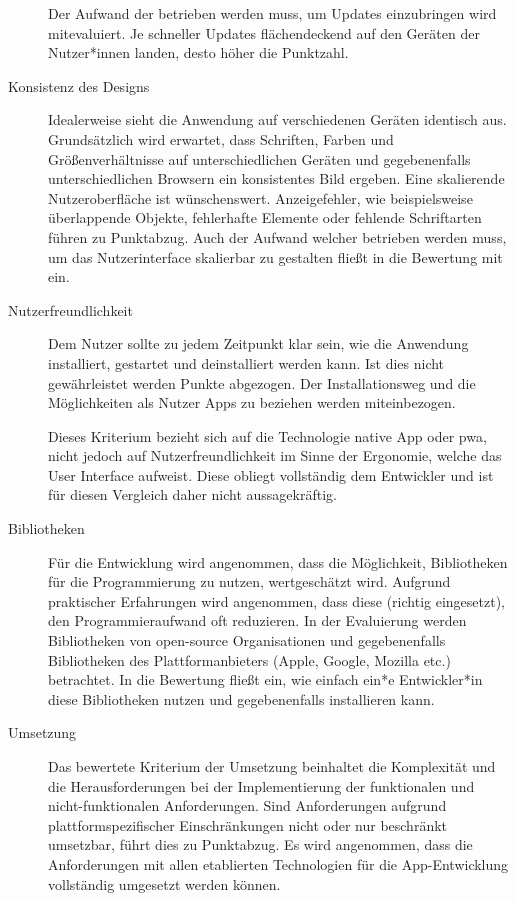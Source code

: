 \begin{description}
	      Der Aufwand der betrieben werden muss, um Updates einzubringen wird mitevaluiert. Je schneller Updates flächendeckend auf den Geräten der Nutzer*innen landen, desto höher die Punktzahl.

	\item [Konsistenz des Designs]
	      Idealerweise sieht die Anwendung auf verschiedenen Geräten identisch aus. Grundsätzlich wird erwartet, dass Schriften, Farben und Größenverhältnisse auf unterschiedlichen Geräten und gegebenenfalls unterschiedlichen Browsern ein konsistentes Bild ergeben.
	      Eine skalierende Nutzeroberfläche ist wünschenswert. Anzeigefehler, wie beispielsweise überlappende Objekte, fehlerhafte Elemente oder fehlende Schriftarten führen zu Punktabzug. Auch der Aufwand welcher betrieben werden muss, um das Nutzerinterface skalierbar zu gestalten fließt in die Bewertung mit ein.

	\item[Nutzerfreundlichkeit]
	      Dem Nutzer sollte zu jedem Zeitpunkt klar sein, wie die Anwendung installiert, gestartet und deinstalliert werden kann. Ist dies nicht gewährleistet werden Punkte abgezogen. Der Installationsweg und die Möglichkeiten als Nutzer Apps zu beziehen werden miteinbezogen.
	      
	      Dieses Kriterium bezieht sich auf die Technologie native App oder \ac{pwa}, nicht jedoch auf Nutzerfreundlichkeit im Sinne der Ergonomie, welche das User Interface aufweist. Diese obliegt vollständig dem Entwickler und ist für diesen Vergleich daher nicht aussagekräftig.

	\item[Bibliotheken]
		Für die Entwicklung wird angenommen, dass die Möglichkeit, Bibliotheken für die Programmierung zu nutzen, wertgeschätzt wird. Aufgrund praktischer Erfahrungen wird angenommen, dass diese (richtig eingesetzt), den Programmieraufwand oft reduzieren. In der Evaluierung werden Bibliotheken von open-source Organisationen und gegebenenfalls Bibliotheken des Plattformanbieters (Apple, Google, Mozilla etc.) betrachtet. In die Bewertung fließt ein, wie einfach ein*e Entwickler*in diese Bibliotheken nutzen und gegebenenfalls installieren kann. 

	\item[Umsetzung]
		Das bewertete Kriterium der Umsetzung beinhaltet die Komplexität und die Herausforderungen bei der Implementierung der funktionalen und nicht-funktionalen Anforderungen. Sind Anforderungen aufgrund plattformspezifischer Einschränkungen nicht oder nur beschränkt umsetzbar, führt dies zu Punktabzug. Es wird angenommen, dass die Anforderungen mit allen etablierten Technologien für die App-Entwicklung vollständig umgesetzt werden können.
		

\end{description}
